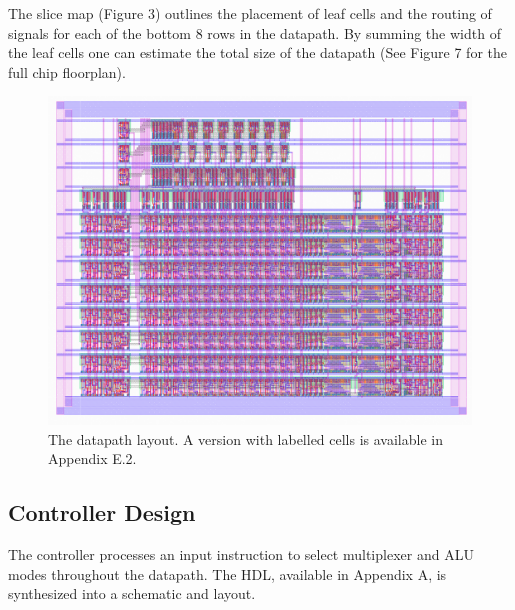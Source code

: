 \documentclass[12pt]{article}
\begin{document}
The slice map (Figure 3) outlines the placement of leaf cells and the routing of signals for each of the bottom 8 rows in the datapath.  By summing the width of the leaf cells one can estimate the total size of the datapath (See Figure 7 for the full chip floorplan).

%

\begin{figure}[H]
    \begin{center}
    \includegraphics[width=12cm]{HMMMDatapathFull.png}
    \end{center}
    \caption{The datapath layout. A version with labelled cells is available in Appendix E.2.}
    \label{fig:datapathlayout}
\end{figure}

\subsection{Controller Design}

The controller processes an input instruction to select multiplexer and ALU modes throughout the datapath. The HDL, available in Appendix A, is synthesized into a schematic and layout.
\end{document}
